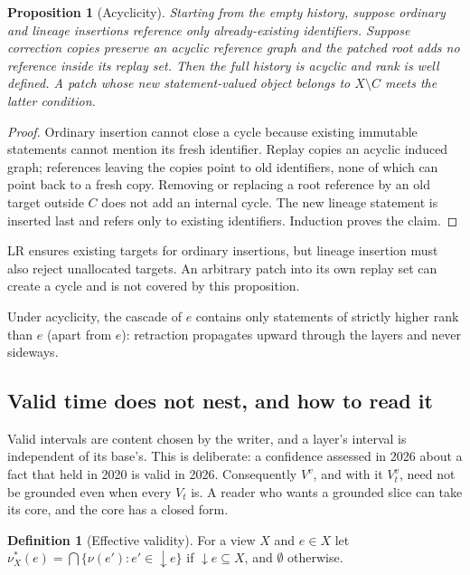 \documentclass[11pt]{article}
\theoremstyle{plain}
\newtheorem{proposition}[theorem]{Proposition}
\theoremstyle{definition}
\newtheorem{definition}{Definition}
\theoremstyle{remark}
\newcommand{\supp}{{\downarrow}}          %
\newcommand{\valid}{\nu}                 %
\newcommand{\View}[2]{V_{#1}^{#2}}
\newcommand{\eff}{\valid^{\ast}}
\begin{document}
\begin{proposition}[Acyclicity]\label{prop:acyclic}
Starting from the empty history, suppose ordinary and lineage insertions
reference only already-existing identifiers. Suppose correction copies preserve
an acyclic reference graph and the patched root adds no reference inside its
replay set. Then the full history is acyclic and rank is well defined. A patch
whose new statement-valued object belongs to $X\setminus C$ meets the latter
condition.
\end{proposition}

\begin{proof}
Ordinary insertion cannot close a cycle because existing immutable statements
cannot mention its fresh identifier. Replay copies an acyclic induced graph;
references leaving the copies point to old identifiers, none of which can point
back to a fresh copy. Removing or replacing a root reference by an old target
outside $C$ does not add an internal cycle. The new lineage statement is inserted
last and refers only to existing identifiers. Induction proves the claim.
\end{proof}

LR ensures existing targets for ordinary insertions, but lineage insertion must
also reject unallocated targets. An arbitrary patch into its own replay set can
create a cycle and is not covered by this proposition.

Under acyclicity, the cascade of $e$ contains only statements of strictly
higher rank than $e$ (apart from $e$): retraction propagates upward through
the layers and never sideways.

\subsection{Valid time does not nest, and how to read it}\label{sec:effective}

Valid intervals are content chosen by the writer, and a layer's interval is
independent of its base's. This is deliberate: a confidence assessed in 2026
about a fact that held in 2020 is valid in 2026. Consequently $V^{v}$, and with
it $\View{t}{v}$, need not be grounded even when every $V_t$ is. A reader who
wants a grounded slice can take its core, and the core has a closed form.

\begin{definition}[Effective validity]
For a view $X$ and $e\in X$ let
$\eff_X(e)=\bigcap\{\valid(e') : e'\in\supp e\}$ if $\supp e\subseteq X$, and
$\emptyset$ otherwise.
\end{definition}
\end{document}
